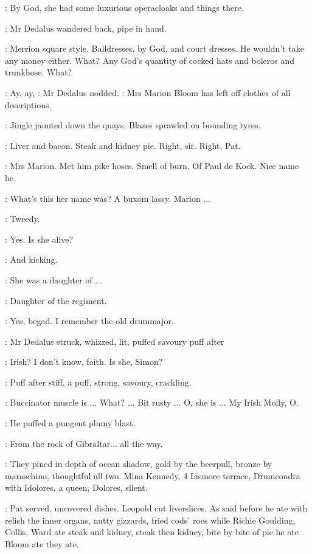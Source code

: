 \dollard:
By God,
she had some luxurious operacloaks
and things there.

:
Mr Dedalus wandered back,
pipe in hand.

\dollard:
Merrion square style.
Balldresses,
by God,
and court dresses.
He
wouldn't take any money either.
What?
Any God's quantity of cocked hats
and boleros and trunkhose.
What?

\simon:
Ay,
ay,
:
Mr Dedalus nodded.
\simon:
Mrs Marion Bloom has left off clothes of all descriptions.

:
Jingle jaunted down the quays.
Blazes sprawled on bounding tyres.

\BloomInt:
Liver and bacon.
Steak and kidney pie.
Right,
sir.
Right,
Pat.

\BloomInt:
Mrs Marion.
Met him pike hoses.
Smell of burn.
Of Paul de Kock.
Nice name he.

\dollard:
What's this her name was?
A buxom lassy.
Marion ...

\simon:
Tweedy.

\dollard:
Yes.
Is she alive?

\simon:
And kicking.

\dollard:
She was a daughter of ...

\simon:
Daughter of the regiment.

\dollard:
Yes,
begad.
I remember the old drummajor.

:
Mr Dedalus struck,
whizzed,
lit,
puffed savoury puff after

\dollard:
Irish?
I don't know,
faith.
Is she,
Simon?

:
Puff after stiff,
a puff,
strong,
savoury,
crackling.

\simon:
Buccinator muscle is ...
What?
...
Bit rusty ...
O,
she is ...
My
Irish Molly,
O.

:
He puffed a pungent plumy blast.

\simon:
From the rock of Gibraltar...
all the way.

:
They pined in depth of ocean shadow,
gold by the beerpull,
bronze by
maraschino,
thoughtful all two.
Mina Kennedy,
4 Lismore terrace,
Drumcondra with Idolores,
a queen,
Dolores,
silent.

:
Pat served,
uncovered dishes.
Leopold cut liverslices.
As said before he ate with relish the inner organs,
nutty gizzards,
fried cods' roes while
Richie Goulding,
Collis,
Ward ate steak and kidney,
steak then kidney,
bite by bite of pie he ate Bloom ate they ate.

